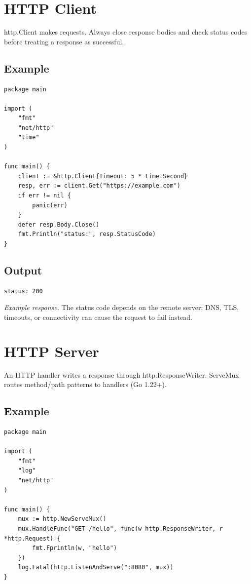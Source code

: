 \documentclass[10pt,oneside]{article}
\newcommand{\sectionline}{\par\vspace{4pt}{\color{rule}\hrule height .5pt}\vspace{7pt}\color{ink}\noindent}
\begin{document}
\section{HTTP Client}
\sectionline
http.Client makes requests. Always close response bodies and check status codes before treating a response as successful.\par
\subsection*{Example}
\begin{lstlisting}[style=gocode]
package main

import (
	"fmt"
	"net/http"
	"time"
)

func main() {
	client := &http.Client{Timeout: 5 * time.Second}
	resp, err := client.Get("https://example.com")
	if err != nil {
		panic(err)
	}
	defer resp.Body.Close()
	fmt.Println("status:", resp.StatusCode)
}
\end{lstlisting}


\subsection*{Output}
\begin{lstlisting}[style=terminal]
status: 200
\end{lstlisting}
\emph{Example response.} The status code depends on the remote server; DNS, TLS, timeouts, or connectivity can cause the request to fail instead.
\clearpage
\section{HTTP Server}
\sectionline
An HTTP handler writes a response through http.ResponseWriter. ServeMux routes method/path patterns to handlers (Go 1.22+).\par
\subsection*{Example}
\begin{lstlisting}[style=gocode]
package main

import (
	"fmt"
	"log"
	"net/http"
)

func main() {
	mux := http.NewServeMux()
	mux.HandleFunc("GET /hello", func(w http.ResponseWriter, r *http.Request) {
		fmt.Fprintln(w, "hello")
	})
	log.Fatal(http.ListenAndServe(":8080", mux))
}
\end{lstlisting}
\end{document}
